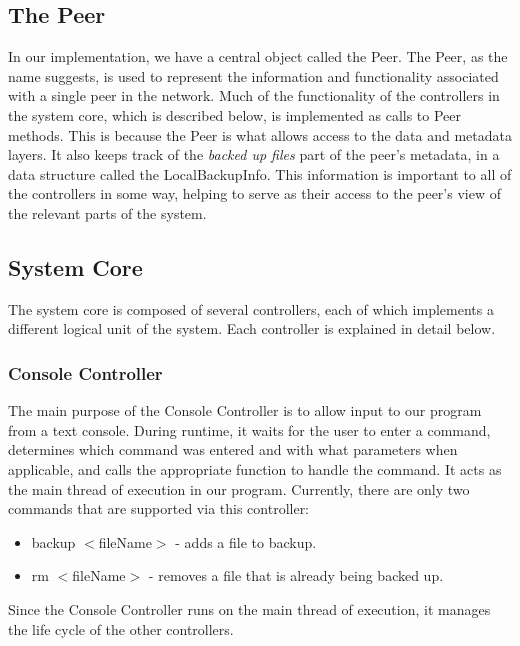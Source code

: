 \documentclass[12pt]{report}
\begin{document}
\subsection{The Peer}
In our implementation, we have a central object called the Peer. The Peer, as the name suggests, is used to represent the information and functionality associated with a single peer in the network. Much of the functionality of the controllers in the system core, which is described below, is implemented as calls to Peer methods. This is because the Peer is what allows access to the data and metadata layers. It also keeps track of the \textit{backed up files} part of the peer's metadata, in a data structure called the LocalBackupInfo. This information is important to all of the controllers in some way, helping to serve as their access to the peer's view of the relevant parts of the system.

\subsection{System Core}
The system core is composed of several controllers, each of which implements a different logical unit of the system. Each controller is explained in detail below.

\subsubsection{Console Controller}
The main purpose of the Console Controller is to allow input to our program from a text console. During runtime, it waits for the user to enter a command, determines which command was entered and with what parameters when applicable, and calls the appropriate function to handle the command. It acts as the main thread of execution in our program. Currently, there are only two commands that are supported via this controller:
\begin{itemize}
\item backup  $<$fileName$>$ - adds a file to backup.
\item rm $<$fileName$>$ - removes a file that is already being backed up.
\end{itemize}
Since the Console Controller runs on the main thread of execution, it manages the life cycle of the other controllers.
\end{document}
